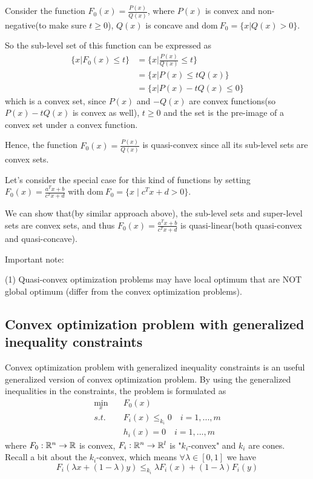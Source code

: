 \begin{example}
	Consider the function $F_0(x) = \frac{P(x)}{Q(x)}$, where $P(x)$ is convex and non-negative(to make sure $t\geq 0$), $Q(x)$ is concave and $\text{dom}\ F_0 = \{x\vert Q(x) >0 \}$.
	
	So the sub-level set of this function can be expressed as
	\begin{align*}
	\{x\vert F_0(x) \leq t \} &= \{x\vert \frac{P(x)}{Q(x)}\leq t \}\\
	&= \{x\vert P(x)\leq tQ(x) \}\\
	&= \{x\vert P(x) - tQ(x)\leq 0 \}
	\end{align*}
	which is a convex set, since $P(x)$ and $-Q(x)$ are convex functions(so $P(x)-tQ(x)$ is convex as well), $t\geq 0$ and the set is the pre-image of a convex set under a convex function.
	
	Hence, the function $F_0(x) = \frac{P(x)}{Q(x)}$ is quasi-convex since all its sub-level sets are convex sets.
	
	Let's consider the special case for this kind of functions by setting $F_0(x)= \frac{a^T x+b}{c^T x +d}$ with $\text{dom}\ F_0=\{x\mid c^T x+d >0 \}$.
	
	We can show that(by similar approach above), the sub-level sets and super-level sets are convex sets, and thus $F_0(x)= \frac{a^T x+b}{c^T x +d}$ is quasi-linear(both quasi-convex and quasi-concave).

\end{example}

 Important note:
 
 (1) Quasi-convex optimization problems may have local optimum that are NOT global optimum (differ from the convex optimization problems).



\vspace{0.5cm}
\subsection{Convex optimization problem with generalized inequality constraints}
Convex optimization problem with generalized inequality constraints is an useful generalized version of convex optimization problem. By using the generalized inequalities in the constraints, the problem is formulated as
\begin{align*}
\min_x\quad & F_0(x) \\
s.t.\quad & F_i(x) \leq_{k_i} 0 \quad i = 1,...,m\\
& h_i(x) = 0\quad i = 1,...,m 
\end{align*}
where $F_0:\mathbb{R}^n\to \mathbb{R}$ is convex, $F_i: \mathbb{R}^n\to \mathbb{R}^l$ is "$k_i$-convex" and $k_i$ are cones. Recall a bit about the $k_i$-convex, which means $\forall \lambda\in [0, 1]$ we have
$$F_i(\lambda x + (1-\lambda)y)\leq_{k_i} \lambda F_i(x) + (1-\lambda)F_i(y)$$



